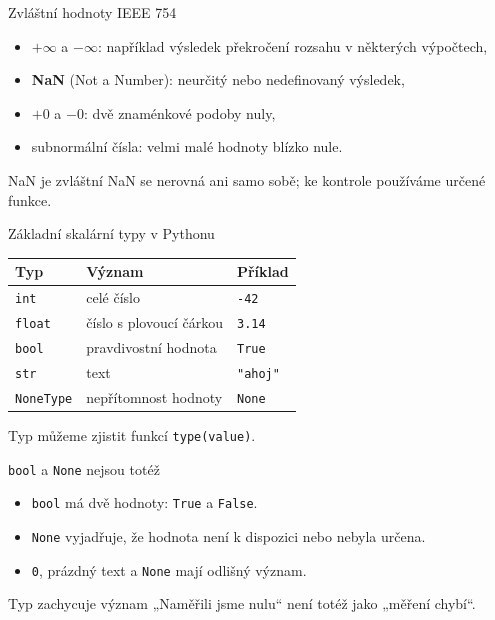 \documentclass[aspectratio=169]{beamer}
\newcommand{\term}[1]{\textcolor{CodeBlue}{\textbf{#1}}}
\begin{document}
\begin{frame}{Zvláštní hodnoty IEEE 754}
  \begin{itemize}
    \item $+\infty$ a $-\infty$: například výsledek překročení rozsahu v některých výpočtech,
    \item \term{NaN} (Not a Number): neurčitý nebo nedefinovaný výsledek,
    \item $+0$ a $-0$: dvě znaménkové podoby nuly,
    \item subnormální čísla: velmi malé hodnoty blízko nule.
  \end{itemize}
  \begin{alertblock}{NaN je zvláštní}
    NaN se nerovná ani samo sobě; ke kontrole používáme určené funkce.
  \end{alertblock}
\end{frame}

\begin{frame}{Základní skalární typy v Pythonu}
  \centering
  \begin{tabular}{lll}
    \textbf{Typ} & \textbf{Význam} & \textbf{Příklad} \\
    \hline
    \texttt{int} & celé číslo & \texttt{-42} \\
    \texttt{float} & číslo s plovoucí čárkou & \texttt{3.14} \\
    \texttt{bool} & pravdivostní hodnota & \texttt{True} \\
    \texttt{str} & text & \texttt{"ahoj"} \\
    \texttt{NoneType} & nepřítomnost hodnoty & \texttt{None} \\
  \end{tabular}
  \vspace{5mm}

  Typ můžeme zjistit funkcí \texttt{type(value)}.
\end{frame}

\begin{frame}{\texttt{bool} a \texttt{None} nejsou totéž}
  \begin{itemize}
    \item \texttt{bool} má dvě hodnoty: \texttt{True} a \texttt{False}.
    \item \texttt{None} vyjadřuje, že hodnota není k dispozici nebo nebyla určena.
    \item \texttt{0}, prázdný text a \texttt{None} mají odlišný význam.
  \end{itemize}
  \begin{block}{Typ zachycuje význam}
    „Naměřili jsme nulu“ není totéž jako „měření chybí“.
  \end{block}
\end{frame}
\end{document}
